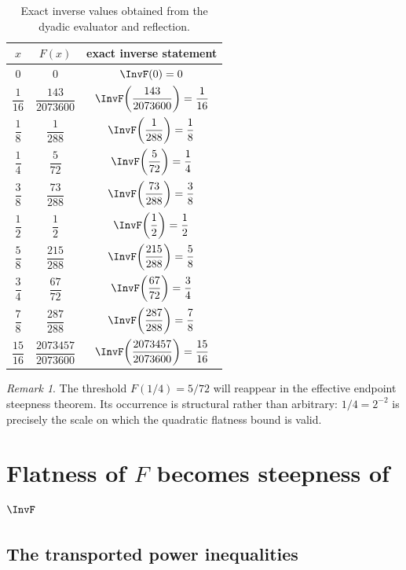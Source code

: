 \documentclass[11pt,oneside]{article}
\theoremstyle{definition}
\theoremstyle{remark}
\newtheorem{remark}[remark]{Remark}
\begin{document}
\begin{table}[ht]
\centering
\small
\begin{tabular}{@{}ccc@{}}
\toprule
$x$ & $F(x)$ & exact inverse statement\\
\midrule
$0$ & $0$ & $\InvF(0)=0$\\
$\dfrac1{16}$ & $\dfrac{143}{2073600}$
  & $\InvF\!\left(\dfrac{143}{2073600}\right)=\dfrac1{16}$\\[0.55em]
$\dfrac18$ & $\dfrac1{288}$
  & $\InvF\!\left(\dfrac1{288}\right)=\dfrac18$\\[0.55em]
$\dfrac14$ & $\dfrac5{72}$
  & $\InvF\!\left(\dfrac5{72}\right)=\dfrac14$\\[0.55em]
$\dfrac38$ & $\dfrac{73}{288}$
  & $\InvF\!\left(\dfrac{73}{288}\right)=\dfrac38$\\[0.55em]
$\dfrac12$ & $\dfrac12$
  & $\InvF\!\left(\dfrac12\right)=\dfrac12$\\[0.55em]
$\dfrac58$ & $\dfrac{215}{288}$
  & $\InvF\!\left(\dfrac{215}{288}\right)=\dfrac58$\\[0.55em]
$\dfrac34$ & $\dfrac{67}{72}$
  & $\InvF\!\left(\dfrac{67}{72}\right)=\dfrac34$\\[0.55em]
$\dfrac78$ & $\dfrac{287}{288}$
  & $\InvF\!\left(\dfrac{287}{288}\right)=\dfrac78$\\[0.55em]
$\dfrac{15}{16}$ & $\dfrac{2073457}{2073600}$
  & $\InvF\!\left(\dfrac{2073457}{2073600}\right)=\dfrac{15}{16}$\\
\bottomrule
\end{tabular}
\caption{Exact inverse values obtained from the dyadic evaluator and
reflection.}
\label{inverse:tab:inverse-dyadic}
\end{table}

\begin{remark}
The threshold $F(1/4)=5/72$ will reappear in the effective endpoint
steepness theorem.  Its occurrence is structural rather than arbitrary:
$1/4=2^{-2}$ is precisely the scale on which the quadratic flatness bound
is valid.
\end{remark}

\section{\texorpdfstring{Flatness of \(F\) becomes steepness of \(\InvF\)}{Flatness of F becomes steepness of its inverse}}
\label{inverse:sec:inverse-steepness}

\subsection{The transported power inequalities}
\end{document}
